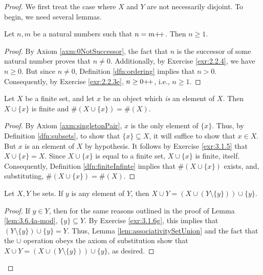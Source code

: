 \documentclass[../main.tex]{subfiles}
\begin{document}
\begin{enumerate}[ref={\thesection.\arabic*}]
\begin{prp}
\begin{enumerate}[label={\textup{(}\alph*\textup{)}},ref={\theenumi\alph*}]
            \begin{proof}
                We first treat the case where $X$ and $Y$ are not necessarily disjoint. To begin, we need several lemmas.
                \begin{lem}\label{lem:positiveNaturalsGeq1}
                    Let $n,m$ be a natural numbers such that $n=m{+\!+}$. Then $n\geq 1$.
                    \begin{proof}
                        By Axiom \ref{axm:0NotSuccessor}, the fact that $n$ is the successor of some natural number proves that $n\neq 0$. Additionally, by Exercise \ref{exr:2.2.4}, we have $n\geq 0$. But since $n\neq 0$, Definition \ref{dfn:ordering} implies that $n>0$. Consequently, by Exercise \ref{exr:2.2.3e}, $n\geq 0{+\!+}$, i.e., $n\geq 1$.
                    \end{proof}
                \end{lem}
                \begin{lem}\label{lem:3.6.4a-mod}
                    Let $X$ be a finite set, and let $x$ be an object which \emph{is} an element of $X$. Then $X\cup\{x\}$ is finite and $\#(X\cup\{x\})=\#(X)$.
                    \begin{proof}
                        By Axiom \ref{axm:singletonPair}, $x$ is the only element of $\{x\}$. Thus, by Definition \ref{dfn:subsets}, to show that $\{x\}\subseteq X$, it will suffice to show that $x\in X$. But $x$ is an element of $X$ by hypothesis. It follows by Exercise \ref{exr:3.1.5} that $X\cup\{x\}=X$. Since $X\cup\{x\}$ is equal to a finite set, $X\cup\{x\}$ is finite, itself. Consequently, Definition \ref{dfn:finiteInfinte} implies that $\#(X\cup\{x\})$ exists, and, substituting, $\#(X\cup\{x\})=\#(X)$.
                    \end{proof}
                \end{lem}
                \begin{lem}\label{lem:yPartitioningXcupY}
                    Let $X,Y$ be sets. If $y$ is any element of $Y$, then $X\cup Y=(X\cup(Y\setminus\{y\}))\cup\{y\}$.
                    \begin{proof}
                        If $y\in Y$, then for the same reasons outlined in the proof of Lemma \ref{lem:3.6.4a-mod}, $\{y\}\subseteq Y$. By Exercise \ref{exr:3.1.6g}, this implies that $(Y\setminus\{y\})\cup\{y\}=Y$. Thus, Lemma \ref{lem:associativitySetUnion} and the fact that the $\cup$ operation obeys the axiom of substitution show that $X\cup Y=(X\cup(Y\setminus\{y\}))\cup\{y\}$, as desired.

\end{proof}
\end{lem}
\end{proof}
\end{enumerate}
\end{prp}
\end{enumerate}
\end{document}
